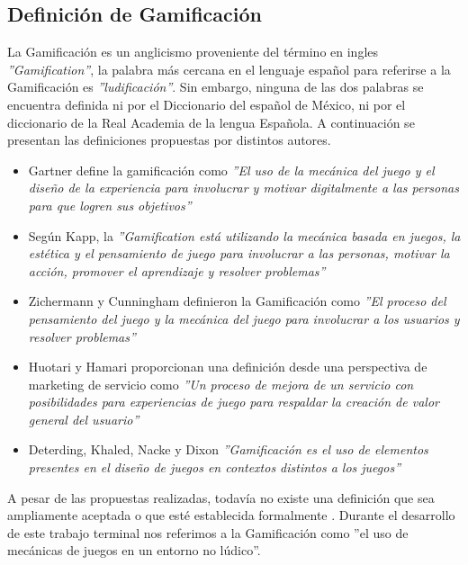 \subsection{Definición de Gamificación}

La Gamificación es un anglicismo proveniente del término en ingles {\it''Gamification''}, la palabra más cercana en el lenguaje español para referirse a la Gamificación es {\it''ludificación''}. Sin embargo, ninguna de las dos palabras se encuentra definida ni por el Diccionario del español de México, ni por el diccionario de la Real Academia de la lengua Española. A continuación se presentan las definiciones propuestas por distintos autores.

\begin{itemize}

    \item Gartner define la gamificación como \textit{''El uso de la mecánica del juego y el diseño de la experiencia para involucrar y motivar digitalmente a las personas para que logren sus objetivos''} \cite{definicion3} %
    
    \item Según Kapp, la \textit{''Gamification está utilizando la mecánica basada en juegos, la estética y el pensamiento de juego para involucrar a las personas, motivar la acción, promover el aprendizaje y resolver problemas''} \cite{definicion4} %
    
    \item Zichermann y Cunningham definieron la Gamificación como \textit{''El proceso del pensamiento del juego y la mecánica del juego para involucrar a los usuarios y resolver problemas''} \cite{GamByDesign} %
    
    \item Huotari y Hamari proporcionan una definición desde una perspectiva de marketing de servicio como \textit{''Un proceso de mejora de un servicio con posibilidades para experiencias de juego para respaldar la creación de valor general del usuario''} \cite{definicion6}  %
    
    \item Deterding, Khaled, Nacke y Dixon \textit{''Gamificación es el uso de elementos presentes en el diseño de juegos en contextos distintos a los juegos''} \cite{definicion7} %
\end{itemize}

\noindent A pesar de las propuestas realizadas, 
todavía no existe una definición que sea ampliamente aceptada o que esté establecida formalmente \cite{definicion2}. Durante el desarrollo de este trabajo terminal nos referimos a la \hypertarget{def:gamificacion}{Gamificación} como ''el uso de mecánicas de juegos en un entorno no lúdico''.

